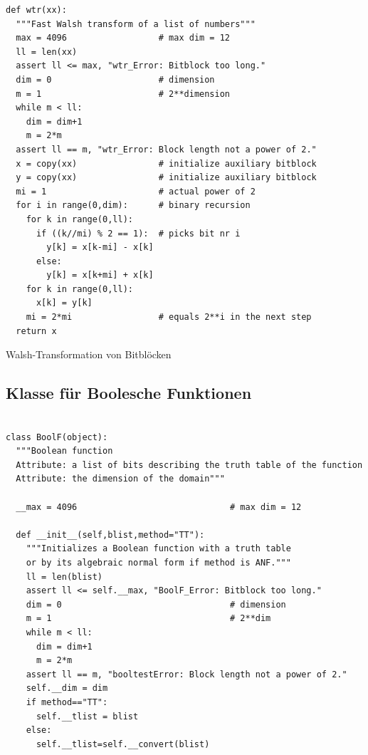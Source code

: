 \begin{refsegment}
\begin{sagecode}
\begin{verbatim}
def wtr(xx):
  """Fast Walsh transform of a list of numbers"""
  max = 4096                  # max dim = 12
  ll = len(xx)
  assert ll <= max, "wtr_Error: Bitblock too long."
  dim = 0                     # dimension
  m = 1                       # 2**dimension
  while m < ll:
    dim = dim+1
    m = 2*m
  assert ll == m, "wtr_Error: Block length not a power of 2."
  x = copy(xx)                # initialize auxiliary bitblock
  y = copy(xx)                # initialize auxiliary bitblock
  mi = 1                      # actual power of 2
  for i in range(0,dim):      # binary recursion
    for k in range(0,ll):
      if ((k//mi) % 2 == 1):  # picks bit nr i
        y[k] = x[k-mi] - x[k]
      else:
        y[k] = x[k+mi] + x[k]
    for k in range(0,ll):
      x[k] = y[k]
    mi = 2*mi                 # equals 2**i in the next step
  return x
\end{verbatim}
\caption{Walsh-Transformation
   von Bitblöcken}\label{Sage-code-bool-walsh}
\end{sagecode}

\subsection{Klasse für Boolesche
  Funktionen}\label{ss-bool-class}

\begin{sagecode}
\begin{verbatim}

class BoolF(object):
  """Boolean function
  Attribute: a list of bits describing the truth table of the function
  Attribute: the dimension of the domain"""

  __max = 4096                              # max dim = 12

  def __init__(self,blist,method="TT"):
    """Initializes a Boolean function with a truth table
    or by its algebraic normal form if method is ANF."""
    ll = len(blist)
    assert ll <= self.__max, "BoolF_Error: Bitblock too long."
    dim = 0                                 # dimension
    m = 1                                   # 2**dim
    while m < ll:
      dim = dim+1
      m = 2*m
    assert ll == m, "booltestError: Block length not a power of 2."
    self.__dim = dim
    if method=="TT":
      self.__tlist = blist
    else:
      self.__tlist=self.__convert(blist)


\end{verbatim}
\end{sagecode}
\end{refsegment}
